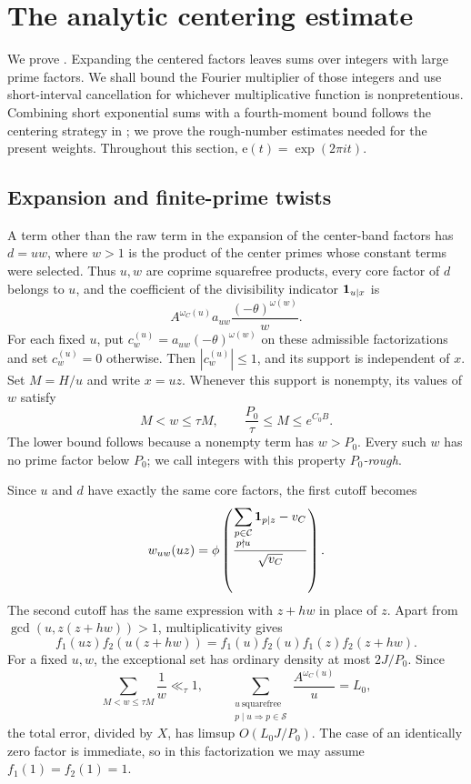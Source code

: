 \section{The analytic centering estimate}\label{sec:analytic-centering}

We prove . Expanding the centered factors
leaves sums over integers with large prime factors. We shall bound the
Fourier multiplier of those integers and use short-interval cancellation
for whichever multiplicative function is nonpretentious. Combining short
exponential sums with a fourth-moment bound follows the centering
strategy in \cite[Appendix~C]{Pilatte26}; we prove the rough-number
estimates needed for the present weights. Throughout this section,
$\mathrm e(t)=\exp(2\pi it)$.

\subsection{Expansion and finite-prime twists}

A term other than the raw term in the expansion of the center-band
factors has $d=uw$, where $w>1$ is the product of the center primes
whose constant terms were selected. Thus $u,w$ are coprime squarefree
products, every core factor of $d$ belongs to $u$, and the coefficient
of the divisibility indicator $\mathbf 1_{u\mid x}$ is
\[
 A^{\omega_C(u)}a_{uw}\frac{(-\theta)^{\omega(w)}}w.
\]
For each fixed $u$, put $c_w^{(u)}=a_{uw}(-\theta)^{\omega(w)}$ on
these admissible factorizations and set $c_w^{(u)}=0$ otherwise.
Then $|c_w^{(u)}|\le1$, and its support is independent of $x$.
Set $M=H/u$ and write $x=uz$. Whenever this support is nonempty,
its values of $w$ satisfy
\begin{equation}\label{eq:analytic-rough-range}
 M<w\le\tau M,\qquad
 \frac{P_0}{\tau}\le M\le e^{C_0B}.
\end{equation}
The lower bound follows because a nonempty term has $w>P_0$.
Every such $w$ has no prime factor below $P_0$; we call integers with
this property \emph{$P_0$-rough}.

Since $u$ and $d$ have exactly the same core factors, the first
cutoff becomes
\[
 w_{uw}(uz)=\phi\left(
 \frac{\displaystyle\sum_{\substack{p\in\mathcal C\\p\nmid u}}
              \mathbf 1_{p\mid z}-v_C}{\sqrt{v_C}}\right).
\]
The second cutoff has the same expression with $z+hw$ in place of $z$.
Apart from
$\gcd(u,z(z+hw))>1$, multiplicativity gives
\[
 f_1(uz)f_2(u(z+hw))=f_1(u)f_2(u)f_1(z)f_2(z+hw).
\]
For a fixed $u,w$, the exceptional set has ordinary density at most
$2J/P_0$. Since
\begin{equation}\label{eq:analytic-sum-u}
 \sum_{M<w\le\tau M}\frac1w\ll_\tau1,
 \qquad
 \sum_{\substack{u\ \mathrm{squarefree}\\p\mid u\Rightarrow p\in\mathcal S}}
       \frac{A^{\omega_C(u)}}u=L_0,
\end{equation}
the total error, divided by $X$, has limsup $O(L_0J/P_0)$.
The case of an identically zero factor is immediate, so in this
factorization we may assume $f_1(1)=f_2(1)=1$.

